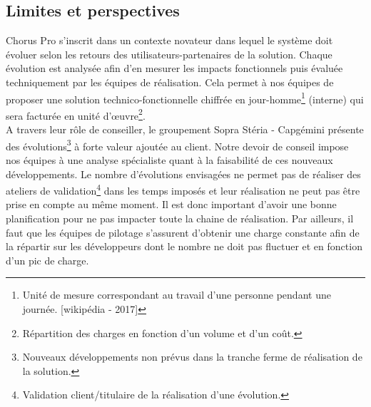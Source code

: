 \documentclass[12pt,a4paper]{article}
\begin{document}
\subsection{Limites et perspectives}
Chorus Pro s'inscrit dans un contexte novateur dans lequel le système doit évoluer selon les retours des utilisateurs-partenaires de la solution. Chaque évolution est analysée afin d'en mesurer les impacts fonctionnels puis évaluée techniquement par les équipes de réalisation. Cela permet à nos équipes de proposer une solution technico-fonctionnelle chiffrée en jour-homme\footnote{Unité de mesure correspondant au travail d’une personne pendant une journée. [wikipédia - 2017]} (interne) qui sera facturée en unité d'œuvre\footnote{Répartition des charges en fonction d'un volume et d'un coût.}.\\
A travers leur rôle de conseiller, le groupement Sopra Stéria - Capgémini présente des évolutions\footnote{Nouveaux développements non prévus dans la tranche ferme de réalisation de la solution.} à forte valeur ajoutée au client. Notre devoir de conseil impose nos équipes à une analyse spécialiste quant à la faisabilité de ces nouveaux développements. Le nombre d'évolutions envisagées ne permet pas de réaliser des ateliers de validation\footnote{Validation client/titulaire de la réalisation d'une évolution.} dans les temps imposés et leur réalisation ne peut pas être prise en compte au même moment. Il est donc important d'avoir une bonne planification pour ne pas impacter toute la chaine de réalisation. Par ailleurs, il faut que les équipes de pilotage s'assurent d'obtenir une charge constante afin de la répartir sur les développeurs dont le nombre ne doit pas fluctuer et en fonction d'un pic de charge.\\ 
\clearpage
\newpage
\end{document}
